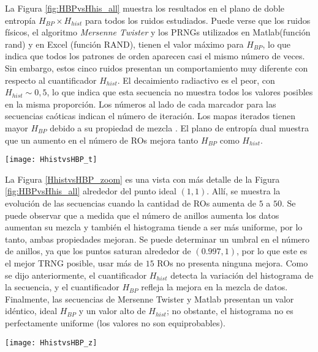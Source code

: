 La Figura \ref{fig:HBPvsHhis_all} muestra los resultados en el plano de doble entropía $H_ {BP} \times H_{hist}$ para todos los ruidos estudiados.
Puede verse que los ruidos físicos, el algoritmo \emph{Mersenne Twister} y los {PRNG}s utilizados en {Matlab}(función {rand}) y en {Excel} (función {RAND}), tienen el valor máximo para $H_{BP}$, lo que indica que todos los patrones de orden aparecen casi el mismo número de veces.
Sin embargo, estos cinco ruidos presentan un comportamiento muy diferente con respecto al cuantificador $H_{hist}$.
El {decaimiento radiactivo} es el peor, con $H_ {hist} \sim 0,5$, lo que indica que esta secuencia no muestra todos los valores posibles en la misma proporción.
Los números al lado de cada marcador para las secuencias caóticas indican el número de iteración.
Los mapas iterados tienen mayor $H_{BP}$ debido a su propiedad de mezcla \cite{DeMicco2008}.
El plano de entropía dual muestra que un aumento en el número de {RO}s mejora tanto $H_{BP}$ como $H_{hist}$.
%
\begin{figure*}
\begin{center}
\texttt{[image: HhistvsHBP\_t]}
\caption{Plano $H_{hist} \times H_{BP}$ para distintos RNGs. Los números que siguen a cada cuadrado indica la cantidad de {RO}s utilizado en cada {TRNG}.
Los números al lado de cada punto en los resultados de los mapas {Logistico} y {TWBM} indican el número de iteración.}
\label{fig:HBPvsHhis_all}
\end{center}
\end{figure*}

La Figura \ref{HhistvsHBP_zoom} es una vista con más detalle de la Figura \ref{fig:HBPvsHhis_all} alrededor del punto ideal $(1,1)$.
Allí, se muestra la evolución de las secuencias cuando la cantidad de {RO}s aumenta de $5$ a $50$.
Se puede observar que a medida que el número de anillos aumenta los datos aumentan su mezcla y también el histograma tiende a ser más uniforme, por lo tanto, ambas propiedades mejoran.
Se puede determinar un umbral en el número de anillos, ya que los puntos saturan alrededor de $(0.997,1)$, por lo que este es el mejor {TRNG} posible, usar más de $15$ {RO}s no presenta ninguna mejora.
Como se dijo anteriormente, el cuantificador $H_ {hist}$ detecta la variación del histograma de la secuencia, y el cuantificador $ H_ {BP} $ refleja la mejora en la mezcla de datos.
Finalmente, las secuencias de Mersenne Twister y Matlab presentan un valor idéntico, ideal $H_ {BP}$ y un valor alto de $H_ {hist}$; no obstante, el histograma no es perfectamente uniforme (los valores no son equiprobables).
%
\begin{figure*}
	\begin{center}
		\texttt{[image: HhistvsHBP\_z]}
		\caption{Detalle de la Fig. \ref{fig:HBPvsHhis_all} alrededor del punto ideal $(1,1)$.}
		\label{HhistvsHBP_zoom}
	\end{center}
\end{figure*}